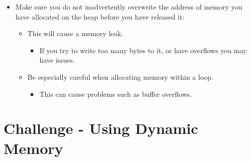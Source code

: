 \begin{itemize}
    \item Make sure you do not inadvertently overwrite the address of memory you have allocated on the heap before you have released it:
        \begin{itemize}
            \item This will cause a memory leak. 
                \begin{itemize}
                    \item If you try to write too many bytes to it, or have overflows you may have issues. 
                \end{itemize}

            \item Be especially careful when allocating memory within a loop. 
                \begin{itemize}
                    \item This can cause problems such as buffer overflows. 
                \end{itemize}
        \end{itemize}
\end{itemize}


\section{Challenge - Using Dynamic Memory}
